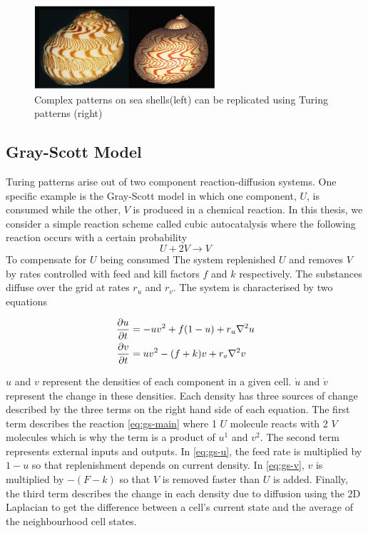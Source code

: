\begin{figure}[!h]
\centering
\includegraphics[width=0.6\textwidth]{images/turing-shell.png}
\caption{Complex patterns on sea shells(left) can be replicated using Turing patterns (right) \cite{meinhardt2009algorithmic}}
\label{fig:seashells}
\end{figure}

\subsection{Gray-Scott Model}

Turing patterns arise out of two component reaction-diffusion systems. One specific example is the Gray-Scott model\cite{gray1983autocatalytic} in which one component, $U$, is consumed while the other, $V$ is produced in a chemical reaction. In this thesis, we consider a simple reaction scheme called cubic autocatalysis where the following reaction occurs with a certain probability
\begin{equation}\label{eq:gs-main}
  U + 2V \rightarrow V
\end{equation}
To compensate for $U$ being consumed The system replenished $U$ and removes $V$ by rates controlled with feed and kill factors $f$ and $k$ respectively. The substances diffuse over the grid at rates $r_u$ and $r_v$. The system is characterised by two equations
\begin{definition} \label{def:reaction-diffusion}
\begin{align} 
  \label{eq:gs-u} \pdv{u}{t} &= -uv^2 + f(1-u) + r_u \nabla^2 u\\
  \label{eq:gs-v} \pdv{v}{t} &= uv^2 - (f+k)v + r_v \nabla^2 v
\end{align}
\end{definition}
$u$ and $v$ represent the densities of each component in a given cell. $\dot{u}$ and $\dot{v}$ represent the change in these densities. Each density has three sources of change described by the three terms on the right hand side of each equation. The first term describes the reaction \ref{eq:gs-main} where 1 $U$ molecule reacts with 2 $V$ molecules which is why the term is a product of $u^1$ and $v^2$. The second term represents external inputs and outputs. In \ref{eq:gs-u}, the feed rate is multiplied by $1-u$ so that replenishment depends on current density. In \ref{eq:gs-v}, $v$ is multiplied by $-(F-k)$ so that $V$ is removed faster than $U$ is added. Finally, the third term describes the change in each density due to diffusion using the 2D Laplacian to get the difference between a cell's current state and the average of the neighbourhood cell states.\\

